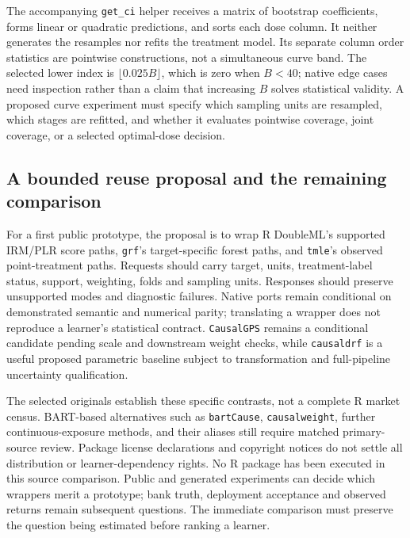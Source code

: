 The accompanying \texttt{get\_ci} helper receives a matrix of bootstrap
coefficients, forms linear or quadratic predictions, and sorts each dose column.
It neither generates the resamples nor refits the treatment model. Its separate
column order statistics are pointwise constructions, not a simultaneous curve
band. The selected lower index is $\lfloor0.025B\rfloor$, which is zero when
$B<40$; native edge cases need inspection rather than a claim that increasing
$B$ solves statistical validity. A proposed curve experiment must specify which
sampling units are resampled, which stages are refitted, and whether it evaluates
pointwise coverage, joint coverage, or a selected optimal-dose decision.
\citep{exec20_rfx_causaldrf,exec20_rfx_reference}

\subsection{A bounded reuse proposal and the remaining comparison}

For a first public prototype, the proposal is to wrap R DoubleML's supported
IRM/PLR score paths, \texttt{grf}'s target-specific forest paths, and
\texttt{tmle}'s observed point-treatment paths. Requests should carry target,
units, treatment-label status, support, weighting, folds and sampling units.
Responses should preserve unsupported modes and diagnostic failures. Native
ports remain conditional on demonstrated semantic and numerical parity;
translating a wrapper does not reproduce a learner's statistical contract.
\texttt{CausalGPS} remains a conditional candidate pending scale and downstream
weight checks, while \texttt{causaldrf} is a useful proposed parametric baseline
subject to transformation and full-pipeline uncertainty qualification.

The selected originals establish these specific contrasts, not a complete R
market census. BART-based alternatives such as \texttt{bartCause},
\texttt{causalweight}, further continuous-exposure methods, and their aliases
still require matched primary-source review. Package license declarations and
copyright notices do not settle all distribution or learner-dependency rights.
No R package has been executed in this source comparison. Public and generated
experiments can decide which wrappers merit a prototype; bank truth, deployment
acceptance and observed returns remain subsequent questions. The immediate
comparison must preserve the question being estimated before ranking a learner.

